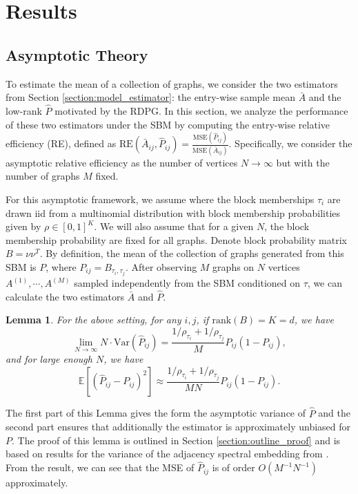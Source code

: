 \documentclass[10pt,letterpaper]{article}
\newtheorem{lemma}[fact]{Lemma}
\newcommand{\Ex}{\mathbb{E}}
\begin{document}
\section{Results}

\subsection{Asymptotic Theory}
\label{section:theoretical_result}
To estimate the mean of a collection of graphs, we consider the two estimators from Section \ref{section:model_estimator}: the entry-wise sample mean $\bar{A}$ and the low-rank $\hat{P}$ motivated by the RDPG.
In this section, we analyze the performance of these two estimators under the SBM by computing the entry-wise relative efficiency (RE), defined as $\mathrm{RE}(\bar{A}_{ij}, \hat{P}_{ij}) = \frac{\mathrm{MSE}(\hat{P}_{ij})}{\mathrm{MSE}(\bar{A}_{ij})}$.
Specifically, we consider the asymptotic relative efficiency as the number of vertices $N\to\infty$ but with the number of graphs $M$ fixed.

For this asymptotic framework, we assume where the block memberships $\tau_i$ are drawn iid from a multinomial distribution with block membership probabilities given by $\rho\in[0,1]^K$.
We will also assume that for a given $N$, the block membership probability are fixed for all graphs.
Denote block probability matrix $B = \nu \nu^T$. 
By definition, the mean of the collection of graphs generated from this SBM is $P$, where $P_{ij} = B_{\tau_i, \tau_j}$. After observing $M$ graphs on $N$ vertices $A^{(1)}, \cdots, A^{(M)}$ sampled independently from the SBM conditioned on $\tau$, we can calculate the two estimators $\bar{A}$ and $\hat{P}$.

\begin{lemma}
\label{lm:VarPhat}
For the above setting, for any $i, j$, if $\mathrm{rank}(B)=K=d$, we have
\[
    \lim_{N \to \infty} N \cdot \mathrm{Var}(\hat{P}_{ij}) =
    \frac{1/\rho_{\tau_i} + 1/\rho_{\tau_j}}{M} P_{ij} (1 - P_{ij}),
\]
and for large enough $N$, we have
\[
    \Ex[(\hat{P}_{ij} - P_{ij})^2] \approx
    \frac{1/\rho_{\tau_i} + 1/\rho_{\tau_j}}{M N} P_{ij}(1-P_{ij}).
\]
\end{lemma}
The first part of this Lemma gives the form the asymptotic variance of $\hat{P}$ and the second part ensures that additionally the estimator is approximately unbiased for $P$.
The proof of this lemma is outlined in Section \ref{section:outline_proof} and is based on results for the variance of the adjacency spectral embedding from \citet{athreya2013limit}. From the result, we can see that the MSE of $\hat{P}_{ij}$ is of order $O(M^{-1}N^{-1})$ approximately.
\end{document}
